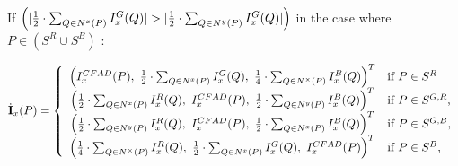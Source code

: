 \documentclass[twoside]{article}
\newcommand\D{I^{CFAD}} %
\begin{document}
%	
		
%	
		




		If $\left(|\frac{1}{2}\cdot\sum_{Q \in \N{x}(P)} I^G_x(Q)|>|\frac{1}{2}\cdot\sum_{Q \in \N{y}(P)} I^G_x(Q)|\right)$ in the case where $P \in (S^R \cup S^B)$ :
		
		\begin{equation}
		\dot{\textbf{I}}_x(P) = \left\lbrace
		\begin{array}{cl}
		\left( \D_x(P), ~\frac{1}{2}\cdot\sum_{Q \in \N{x}(P)} I^G_x(Q),~\frac{1}{4}\cdot\sum_{Q \in \N{\times}(P)} I^B_x(Q) \right)^T & \text{if $P \in S^R$} \\
		\left( \frac{1}{2}\cdot\sum_{Q \in \N{x}(P)} I^R_x(Q),~\D_x(P),~\frac{1}{2}\cdot\sum_{Q \in \N{y}(P)} I^B_x(Q) \right)^T & \text{if $P \in S^{G,R}$,}\\
		\left( \frac{1}{2}\cdot\sum_{Q \in \N{y}(P)} I^R_x(Q),~\D_x(P),~\frac{1}{2}\cdot\sum_{Q \in \N{x}(P)} I^B_x(Q) \right)^T & \text{if $P \in S^{G,B}$,}\\
		\left( \frac{1}{4}\cdot\sum_{Q \in \N{\times}(P)} I^R_x(Q),~\frac{1}{2}\cdot\sum_{Q \in \N{x}(P)} I^G_x(Q),~\D_x(P) \right)^T & \text{if $P \in S^B$,}
		\end{array}\right.
		\label{eq:I^D1_p_x_full}
		\end{equation}
		
\end{document}
